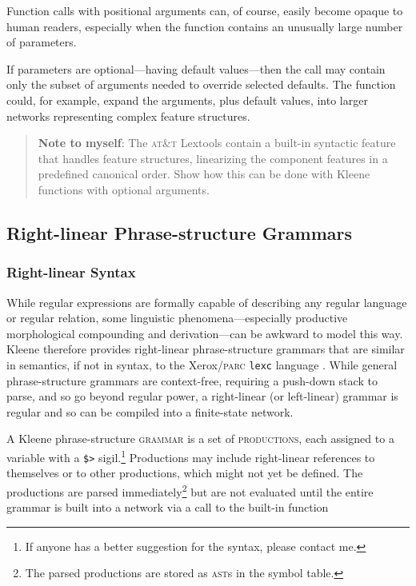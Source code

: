 \documentclass[letterpaper,12pt]{article}
\newcommand{\Kleene}{Kleene\xspace}
\newcommand{\acro}{\textsc}
\begin{document}
\noindent
Function calls with positional arguments can, of course, easily become
opaque to human readers, especially when the function contains an unusually large number of parameters.

If parameters are optional---having default values---then the call
may contain only the subset of arguments needed to override selected
defaults.  The function could, for example, expand the arguments, plus default
values, into larger networks representing complex feature structures.

\begin{quote}
\textbf{Note to myself}: The \acro{at\&t} Lextools contain a
built-in syntactic
feature that handles feature structures, linearizing
the component features in a predefined canonical order.  Show how this
can be done with Kleene functions with optional arguments.
\end{quote}

\subsection{Right-linear Phrase-structure Grammars}

\subsubsection{Right-linear Syntax}

While regular expressions are formally capable of describing any
regular language or regular relation, some linguistic
phenomena---especially productive morphological compounding and
derivation---can be awkward to model this way.  \Kleene{}
therefore provides right-linear phrase-structure grammars that
are similar in semantics, if not in syntax, to the
Xerox/\acro{parc} \texttt{lexc} language \cite{beesley+karttunen:2003}.  While general phrase-structure
grammars are context-free, requiring a push-down stack to parse, and so go beyond
regular power, a right-linear (or left-linear) grammar is regular and so can be
compiled into a finite-state network.  


A \Kleene{} phrase-structure \acro{grammar} is a set of
\acro{productions}, each
assigned to a variable with a \verb!$>! sigil.\footnote{If anyone has a better
suggestion for the syntax, please contact me.}  Productions may
include right-linear references to themselves or to other
productions, which might not yet be defined.  The productions are parsed
immediately\footnote{The parsed productions are stored as \acro{ast}s in the
symbol table.} but are not evaluated until the entire grammar is built
into a network via a call to the built-in function
\end{document}
